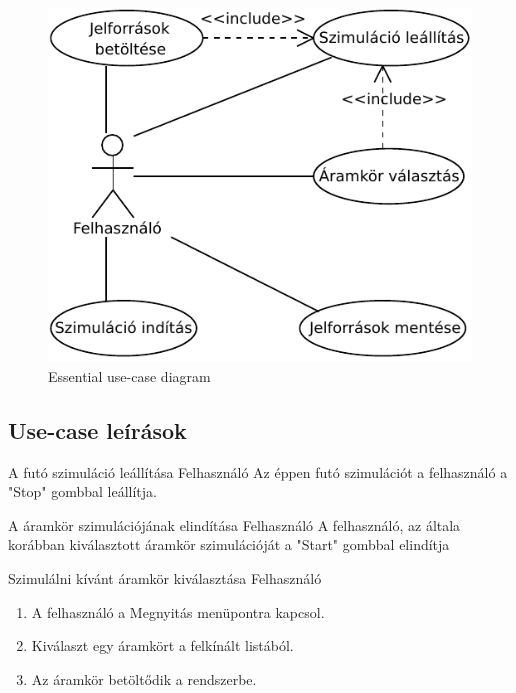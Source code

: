 \begin{figure}[H]
\begin{center}
\includegraphics{chapters/chapter02/usecase.pdf}
\caption{Essential use-case diagram}
\label{fig:useCase1}
\end{center}
\end{figure}

\subsection{Use-case leírások}
\label{sec:usecasedesc}

{A futó szimuláció leállítása}
{Felhasználó}
{Az éppen futó szimulációt a felhasználó a "Stop" gombbal leállítja.}

{A áramkör szimulációjának elindítása}
{Felhasználó}
{A felhasználó, az általa korábban kiválasztott áramkör szimulációját a "Start" gombbal elindítja}

{Szimulálni kívánt áramkör kiválasztása}
{Felhasználó}
{\vspace{-20pt}\begin{enumerate}
\setlength{\itemsep}{0cm}%
\setlength{\parskip}{0cm}%
\item A felhasználó a Megnyitás menüpontra kapcsol.
\item Kiválaszt egy áramkört a felkínált listából.
\item Az áramkör betöltődik a rendszerbe.
\end{enumerate}\vspace{-20pt}}

